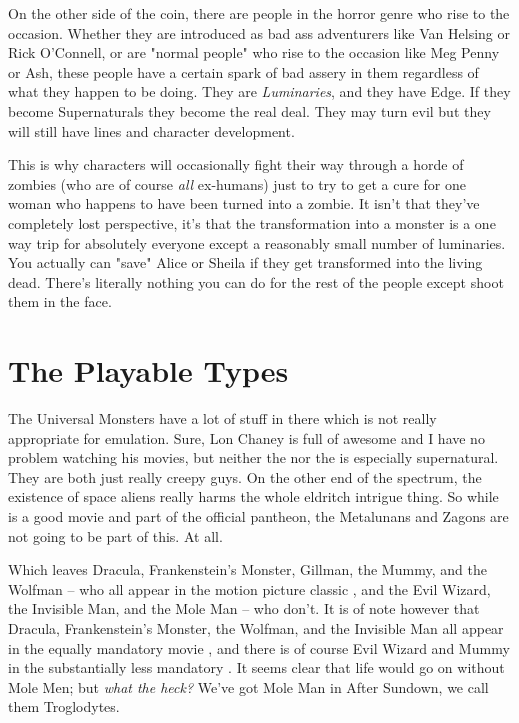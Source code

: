 On the other side of the coin, there are people in the horror genre who rise to the occasion. Whether they are introduced as bad ass adventurers like Van Helsing or Rick O'Connell, or are "normal people" who rise to the occasion like Meg Penny or Ash, these people have a certain spark of bad assery in them regardless of what they happen to be doing. They are \textit{Luminaries}, and they have Edge. If they become Supernaturals they become the real deal. They may turn evil but they will still have lines and character development.

This is why characters will occasionally fight their way through a horde of zombies (who are of course \textit{all} ex-humans) just to try to get a cure for one woman who happens to have been turned into a zombie. It isn't that they've completely lost perspective, it's that the transformation into a monster is a one way trip for absolutely everyone except a reasonably small number of luminaries. You actually can "save" Alice or Sheila if they get transformed into the living dead. There's literally nothing you can do for the rest of the people except shoot them in the face.

\section{The Playable Types}

\hspace{\parindent} The Universal Monsters have a lot of stuff in there which is not really appropriate for emulation. Sure, Lon Chaney is full of awesome and I have no problem watching his movies, but neither the  nor the  is especially supernatural. They are both just really creepy guys. On the other end of the spectrum, the existence of space aliens really harms the whole eldritch intrigue thing. So while  is a good movie and part of the official pantheon, the Metalunans and Zagons are not going to be part of this. At all. 

Which leaves Dracula, Frankenstein's Monster, Gillman, the Mummy, and the Wolfman -- who all appear in the motion picture classic , and the Evil Wizard, the Invisible Man, and the Mole Man -- who don't. It is of note however that Dracula, Frankenstein's Monster, the Wolfman, and the Invisible Man all appear in the equally mandatory movie , and there is of course Evil Wizard and Mummy in the substantially less mandatory . It seems clear that life would go on without Mole Men; but \textit{what the heck?} We've got Mole Man in After Sundown, we call them Troglodytes.

